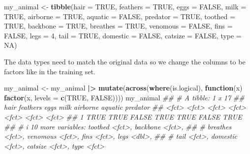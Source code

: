 \documentclass[
  notitlepage]{book}
\newenvironment{Shaded}{\begin{snugshade}}{\end{snugshade}}
\newcommand{\CommentTok}[1]{\textcolor[rgb]{0.56,0.35,0.01}{\textit{#1}}}
\newcommand{\ControlFlowTok}[1]{\textcolor[rgb]{0.13,0.29,0.53}{\textbf{#1}}}
\newcommand{\DataTypeTok}[1]{\textcolor[rgb]{0.13,0.29,0.53}{#1}}
\newcommand{\DecValTok}[1]{\textcolor[rgb]{0.00,0.00,0.81}{#1}}
\newcommand{\ErrorTok}[1]{\textcolor[rgb]{0.64,0.00,0.00}{\textbf{#1}}}
\newcommand{\KeywordTok}[1]{\textcolor[rgb]{0.13,0.29,0.53}{\textbf{#1}}}
\newcommand{\NormalTok}[1]{#1}
\newcommand{\OperatorTok}[1]{\textcolor[rgb]{0.81,0.36,0.00}{\textbf{#1}}}
\newcommand{\OtherTok}[1]{\textcolor[rgb]{0.56,0.35,0.01}{#1}}
\newcommand{\StringTok}[1]{\textcolor[rgb]{0.31,0.60,0.02}{#1}}
\begin{document}
\begin{Shaded}
\begin{Highlighting}[]
\NormalTok{my\_animal \textless{}{-}}\StringTok{ }\KeywordTok{tibble}\NormalTok{(}\DataTypeTok{hair =} \OtherTok{TRUE}\NormalTok{, }\DataTypeTok{feathers =} \OtherTok{TRUE}\NormalTok{, }\DataTypeTok{eggs =} \OtherTok{FALSE}\NormalTok{,}
  \DataTypeTok{milk =} \OtherTok{TRUE}\NormalTok{, }\DataTypeTok{airborne =} \OtherTok{TRUE}\NormalTok{, }\DataTypeTok{aquatic =} \OtherTok{FALSE}\NormalTok{, }\DataTypeTok{predator =} \OtherTok{TRUE}\NormalTok{,}
  \DataTypeTok{toothed =} \OtherTok{TRUE}\NormalTok{, }\DataTypeTok{backbone =} \OtherTok{TRUE}\NormalTok{, }\DataTypeTok{breathes =} \OtherTok{TRUE}\NormalTok{, }
  \DataTypeTok{venomous =} \OtherTok{FALSE}\NormalTok{, }\DataTypeTok{fins =} \OtherTok{FALSE}\NormalTok{, }\DataTypeTok{legs =} \DecValTok{4}\NormalTok{, }\DataTypeTok{tail =} \OtherTok{TRUE}\NormalTok{, }
  \DataTypeTok{domestic =} \OtherTok{FALSE}\NormalTok{, }\DataTypeTok{catsize =} \OtherTok{FALSE}\NormalTok{, }\DataTypeTok{type =} \OtherTok{NA}\NormalTok{)}
\end{Highlighting}
\end{Shaded}

The data types need to match the original data so we
change the columns to be factors like in the training set.

\begin{Shaded}
\begin{Highlighting}[]
\NormalTok{my\_animal \textless{}{-}}\StringTok{ }\NormalTok{my\_animal }\OperatorTok{|}\ErrorTok{\textgreater{}}\StringTok{ }
\StringTok{  }\KeywordTok{mutate}\NormalTok{(}\KeywordTok{across}\NormalTok{(}\KeywordTok{where}\NormalTok{(is.logical), }
                \ControlFlowTok{function}\NormalTok{(x) }\KeywordTok{factor}\NormalTok{(x, }\DataTypeTok{levels =} \KeywordTok{c}\NormalTok{(}\OtherTok{TRUE}\NormalTok{, }\OtherTok{FALSE}\NormalTok{))))}
\NormalTok{my\_animal}
\CommentTok{\#\# \# A tibble: 1 x 17}
\CommentTok{\#\#   hair  feathers eggs  milk  airborne aquatic predator}
\CommentTok{\#\#   \textless{}fct\textgreater{} \textless{}fct\textgreater{}    \textless{}fct\textgreater{} \textless{}fct\textgreater{} \textless{}fct\textgreater{}    \textless{}fct\textgreater{}   \textless{}fct\textgreater{}   }
\CommentTok{\#\# 1 TRUE  TRUE     FALSE TRUE  TRUE     FALSE   TRUE    }
\CommentTok{\#\# \# i 10 more variables: toothed \textless{}fct\textgreater{}, backbone \textless{}fct\textgreater{},}
\CommentTok{\#\# \#   breathes \textless{}fct\textgreater{}, venomous \textless{}fct\textgreater{}, fins \textless{}fct\textgreater{}, legs \textless{}dbl\textgreater{},}
\CommentTok{\#\# \#   tail \textless{}fct\textgreater{}, domestic \textless{}fct\textgreater{}, catsize \textless{}fct\textgreater{}, type \textless{}fct\textgreater{}}
\end{Highlighting}
\end{Shaded}
\end{document}
